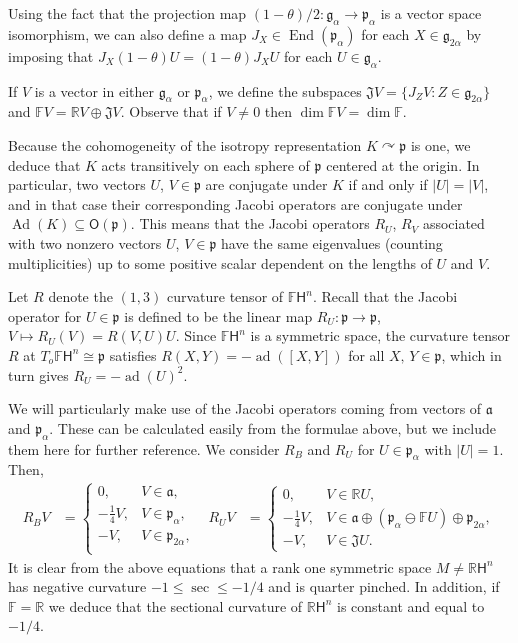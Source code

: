 \documentclass[12pt, a4paper]{amsart}
\newcommand{\g}{\mathfrak}
\newcommand{\s}{\mathsf}
\newcommand{\R}{\mathbb{R}}
\newcommand{\F}{\mathbb{F}}
\newcommand{\ad}{\operatorname{ad}}
\newcommand{\Ad}{\operatorname{Ad}}
\newcommand{\End}{\operatorname{End}}
\theoremstyle{definition}
\begin{document}
Using the fact that the projection map $(1-\theta)/2\colon \g{g}_{\alpha}\to \g{p}_{\alpha}$ is a vector space isomorphism,
we can also define a map $J_{X}\in \End(\g{p}_{\alpha})$ for each $X\in \g{g}_{2\alpha}$
by imposing that $J_{X}(1-\theta)U=(1-\theta)J_{X}U$ for each $U\in \g{g}_{\alpha}$.

If $V$ is a vector in either $\g{g}_{\alpha}$ or $\g{p}_{\alpha}$, we define the subspaces
$\g{J}V=\{J_Z V:Z\in\g{g}_{2\alpha}\}$ and $\F V = \R V \oplus \g{J} V$.
Observe that if $V \neq 0$ then $\dim \F V = \dim \F$.

Because the cohomogeneity of the isotropy representation ${K}\curvearrowright \g{p}$ is one, 
we deduce that ${K}$ acts transitively on each sphere of $\g{p}$ centered at the origin.
In particular, two vectors $U$, $V\in\g{p}$ are conjugate under ${K}$ 
if and only if $\lvert U \rvert = \lvert V \rvert$, 
and in that case their corresponding Jacobi operators are conjugate under $\Ad({K})\subseteq \s{O}(\g{p})$.
This means that the Jacobi operators $R_U$, $R_V$ associated with two nonzero vectors $U$, $V\in \g{p}$ have the same eigenvalues (counting multiplicities) up to some positive scalar dependent on the lengths of $U$ and $V$.

Let $R$ denote the $(1,3)$ curvature tensor of $\mathbb{F}\s{H}^n$.
Recall that the Jacobi operator for $U\in\g{p}$ is defined to be
the linear map $R_U\colon\g{p}\to\g{p}$, $V\mapsto R_U(V)=R(V,U)U$.
Since $\mathbb{F}\s{H}^n$ is a symmetric space, the curvature tensor $R$
at $T_o\mathbb{F}\s{H}^n\cong \g{p}$ satisfies $R(X,Y)=-\ad([X,Y])$ for all $X,\,Y\in \g{p}$,
which in turn gives $R_U = -\ad(U)^2$.

We will particularly make use of the Jacobi operators coming from vectors of $\g{a}$ and $\g{p}_\alpha$.
These can be calculated easily from the formulae above, but we include them here for further reference.
We consider $R_{B}$ and $R_{U}$ for $U\in \g{p}_\alpha$ with $\lvert U \rvert=1$.
Then,
\begin{equation}\label{eq:jacobi}
\begin{aligned}
R_{B}V
&{}=
\begin{cases}
0, & V\in \g{a}, \\
-\frac{1}{4} V, & V\in \g{p}_\alpha, \\
-V, & V\in \g{p}_{2 \alpha}, \\
\end{cases}
&
R_{U}V 
&{}= 
\begin{cases}
0, & V\in \R U, \\
-\frac{1}{4}V, & V\in \g{a}\oplus(\g{p}_\alpha\ominus\F U)\oplus\g{p}_{2\alpha}, \\
-V, & V\in \g{J}U.
\end{cases}
\end{aligned}
\end{equation}
It is clear from the above equations that a rank one symmetric space $M\neq \R\s{H}^n$
has negative curvature $-1\leq \sec \leq -{1}/{4}$ and is quarter pinched.
In addition, if $\F=\R$ we deduce that the sectional curvature of $\R\s{H}^n$
is constant and equal to $-1/4$.
\end{document}
